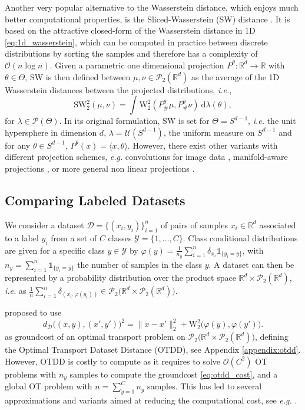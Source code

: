 \documentclass[twoside]{article}
\newcommand{\cP}{\mathcal{P}}
\newcommand{\cD}{\mathcal{D}}
\newcommand{\cY}{\mathcal{Y}}
\newcommand{\cO}{\mathcal{O}}
\newcommand{\cU}{\mathcal{U}}
\newcommand{\W}{\mathrm{W}}
\newcommand{\R}{\mathbb{R}}
\newcommand{\sw}{\mathrm{SW}}
\begin{document}
 Another very popular alternative to the Wasserstein distance, which enjoys much better computational properties, is the Sliced-Wasserstein (SW) distance \citep{rabin2012wasserstein, bonneel2015sliced}. It is based on the attractive closed-form of the Wasserstein distance in 1D \eqref{eq:1d_wasserstein}, which can be computed in practice between discrete distributions by sorting the samples and therefore has a complexity of $\cO(n\log n)$. Given a parametric one dimensional projection $P^\theta:\R^d\to \R$ with $\theta\in\Theta$, SW is then defined between $\mu,\nu\in\cP_2(\R^d)$ as the average of the 1D Wasserstein distances between the projected distributions, \emph{i.e.},
\begin{equation} \label{eq:sw}
    \sw_2^2(\mu,\nu) = \int \W_2^2(P^\theta_\#\mu,P^\theta_\#\nu)\ \mathrm{d}\lambda(\theta),
\end{equation}
for $\lambda\in\cP(\Theta)$. In its original formulation, SW is set for $\Theta=S^{d-1}$, \emph{i.e.} the unit hypersphere in dimension $d$, 
$\lambda=\cU(S^{d-1})$, the uniform measure on $S^{d-1}$ and for any $\theta\in S^{d-1}$, $P^\theta(x)=\langle x,\theta\rangle$. However, there exist other variants with different projection schemes, \emph{e.g.} convolutions for image data \citep{nguyen2022revisiting}, manifold-aware projections \citep{bonet2023hyperbolic, bonet2023sliced, bonet2025sliced}, or more general non linear projections \citep{kolouri2019generalized, chen2022augmented}.


\subsection{Comparing Labeled Datasets}

We consider a dataset $\cD=\big\{(x_i,y_i)\big\}_{i=1}^n$ of pairs of samples $x_i\in \R^d$ associated to a label $y_i$ from a set of $C$ classes $\cY = \{1,\dots,C\}$. Class conditional distributions are given for a specific class $y\in\cY$ by $\varphi(y) = \frac{1}{n_y}\sum_{i=1}^n \delta_{x_i}\mathbb{1}_{\{y_i=y\}}$, with $n_y=\sum_{i=1}^n \mathbb{1}_{\{y_i=y\}}$ the number of samples in the class $y$. A dataset can then be represented by a probability distribution over the product space $\R^d\times \cP_2(\R^d)$, \emph{i.e.} as $\frac{1}{n}\sum_{i=1}^n \delta_{(x_i,\varphi(y_i))}\in\cP_2(\R^d\times \cP_2(\R^d)\big)$. 

\citet{alvarez2020geometric} proposed to use 
\begin{equation}\label{eq:otdd_cost}
    d_{\cD}\big((x,y), (x',y')\big)^2 = \|x-x'\|_2^2 + \W_2^2\big(\varphi(y), \varphi(y')\big).
\end{equation}
 as groundcost of an optimal transport problem on $\cP_2\big(\R^d\times\cP_2(\R^d)\big)$, defining the Optimal Transport Dataset Distance (OTDD), see Appendix \ref{appendix:otdd}. However, OTDD is costly to compute as it requires to solve $\cO(C^2)$ OT problems with $n_y$ samples to compute the groundcost \eqref{eq:otdd_cost}, and a global OT problem with $n=\sum_{y=1}^C n_y$ samples.
This has led to several approximations and variants aimed at reducing the computational cost, see \emph{e.g.} \citep{hua2023dynamic, liu2025wasserstein, nguyen2025lightspeed, bonet2025flowing}. 
\end{document}
